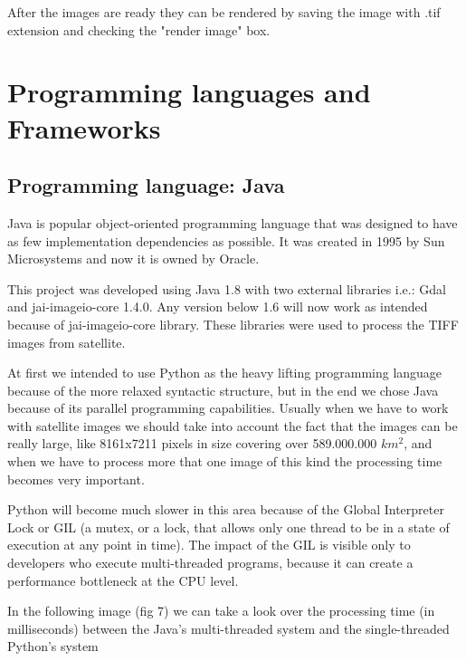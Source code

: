 \documentclass[12pt, a4paper]{report}
\begin{document}
After the images are ready they can be rendered by saving the image with .tif extension and checking the "render image" box.



\section{Programming languages and Frameworks} 

\subsection{Programming language: Java}
\medskip

\quad
Java is popular object-oriented programming language that was designed to have as few implementation dependencies as possible. It was created in 1995 by Sun Microsystems and now it is owned by Oracle.
\par

This project was developed using Java 1.8 with two external libraries i.e.: Gdal and jai-imageio-core 1.4.0. Any version below 1.6 will now work as intended because of jai-imageio-core library. These libraries were used to process the TIFF images from satellite.
\par

At first we intended to use Python as the heavy lifting programming language because of the more relaxed syntactic structure, but in the end we chose Java because of its parallel programming capabilities. Usually when we have to work with satellite images we should take into account the fact that the images can be really large, like 8161x7211 pixels in size covering over 589.000.000 $km^2$, and when we have to process more that one image of this kind the processing time becomes very important.
\par

Python will become much slower in this area because of the Global Interpreter Lock or GIL (a mutex, or a lock, that allows only one thread to be in a state of execution at any point in time). The impact of the GIL is visible only to developers who execute multi-threaded programs, because it can create a performance bottleneck at the CPU level.
 \par
 
\bigskip

In the following image (fig 7) we can take a look over the processing time (in milliseconds) between the Java's multi-threaded system and the single-threaded Python's system
\par
\end{document}
